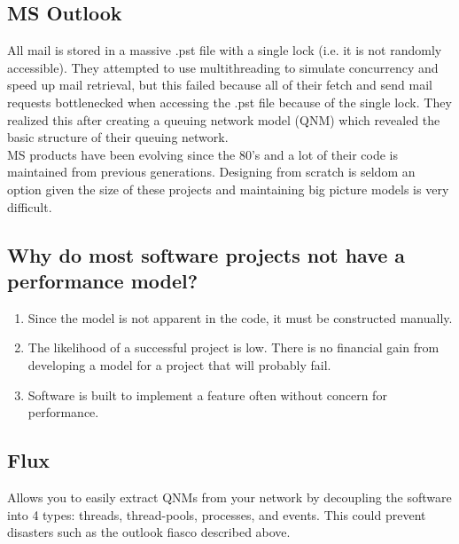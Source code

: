 \documentclass[twoside]{article}
\begin{document}
\subsection{MS Outlook}
All mail is stored in a massive .pst file with a single lock (i.e. it is not randomly accessible).  They attempted to use multithreading to simulate concurrency and speed up mail retrieval, but this failed because all of their fetch and send mail requests bottlenecked when accessing the .pst file because of the single lock.  They realized this after creating a queuing network model (QNM) which revealed the basic structure of their queuing network.\\
MS products have been evolving since the 80's and a lot of their code is maintained from previous generations.  Designing from scratch is seldom an option given the size of these projects and maintaining big picture models is very difficult.
\subsection{Why do most software projects not have a performance model?}
\begin{enumerate}
	\item Since the model is not apparent in the code, it must be constructed manually.
	\item The likelihood of a successful project is low. There is no financial gain from developing a model for a project that will probably fail.
	\item Software is built to implement a feature often without concern for performance.
\end{enumerate}

\subsection{Flux}
Allows you to easily extract QNMs from your network by decoupling the software into 4 types: threads, thread-pools, processes, and events.  This could prevent disasters such as the outlook fiasco described above.
\end{document}

